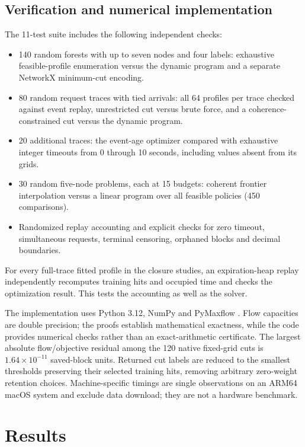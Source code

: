 \documentclass[11pt,a4paper]{article}
\begin{document}
\subsection{Verification and numerical implementation}
The 11-test suite includes the following independent checks:
\begin{itemize}
\item 140 random forests with up to seven nodes and four labels: exhaustive
feasible-profile enumeration versus the dynamic program and a separate NetworkX
minimum-cut encoding.
\item 80 random request traces with tied arrivals: all 64 profiles per trace
checked against event replay, unrestricted cut versus brute force, and a
coherence-constrained cut versus the dynamic program.
\item 20 additional traces: the event-age optimizer compared with exhaustive
integer timeouts from 0 through 10 seconds, including values absent from its grids.
\item 30 random five-node problems, each at 15 budgets: coherent frontier
interpolation versus a linear program over all feasible policies (450 comparisons).
\item Randomized replay accounting and explicit checks for zero timeout,
simultaneous requests, terminal censoring, orphaned blocks and decimal boundaries.
\end{itemize}
For every full-trace fitted profile in the closure studies, an expiration-heap
replay independently recomputes training hits and occupied time and checks the
optimization result. This tests the accounting as well as the solver.

The implementation uses Python 3.12, NumPy and PyMaxflow \cite{pymaxflow}. Flow capacities are
double precision; the proofs establish mathematical exactness, while the code
provides numerical checks rather than an exact-arithmetic certificate. The largest
absolute flow/objective residual among the 120 native fixed-grid cuts is
$1.64\times10^{-11}$ saved-block units. Returned cut labels are reduced to the
smallest thresholds preserving their selected training hits, removing arbitrary
zero-weight retention choices. Machine-specific timings are single observations
on an ARM64 macOS system and exclude data download; they are not a hardware
benchmark.

\section{Results}\label{sec:results}
\end{document}
